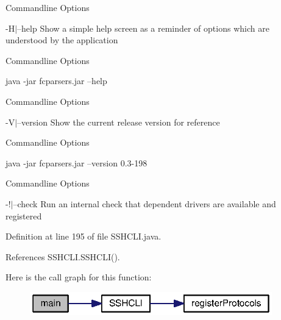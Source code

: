\begin{DoxyRefDesc}{Commandline Options}
\item[{\bf Commandline Options}]-\/\+H$\vert$--help Show a simple help screen as a reminder of options which are understood by the application \end{DoxyRefDesc}
\begin{DoxyRefDesc}{Commandline Options}
\item[{\bf Commandline Options}]
\begin{DoxyCode}
java -jar fcparsers.jar --help 
\end{DoxyCode}
\end{DoxyRefDesc}


\begin{DoxyRefDesc}{Commandline Options}
\item[{\bf Commandline Options}]-\/\+V$\vert$--version Show the current release version for reference \end{DoxyRefDesc}
\begin{DoxyRefDesc}{Commandline Options}
\item[{\bf Commandline Options}]
\begin{DoxyCode}
java -jar fcparsers.jar --version
0.3-198 
\end{DoxyCode}
\end{DoxyRefDesc}


\begin{DoxyRefDesc}{Commandline Options}
\item[{\bf Commandline Options}]-\/!$\vert$--check Run an internal check that dependent drivers are available and registered \end{DoxyRefDesc}


Definition at line 195 of file S\+S\+H\+C\+L\+I.\+java.



References S\+S\+H\+C\+L\+I.\+S\+S\+H\+C\+L\+I().



Here is the call graph for this function\+:\nopagebreak
\begin{figure}[H]
\begin{center}
\leavevmode
\includegraphics[width=298pt]{classorg_1_1smallfoot_1_1parser_1_1SSHCLI_a75988cf84fc6ee7a2ebff36e363021aa_cgraph}
\end{center}
\end{figure}


